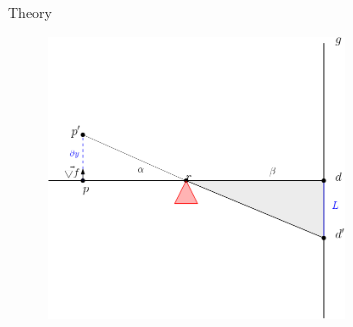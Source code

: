 \documentclass{beamer}
\begin{document}
\begin{frame}{Theory}
	\begin{figure}
		\includegraphics[width = 0.7\textwidth]{Images/gradient2.png}
	\end{figure}
\end{frame}
\end{document}

